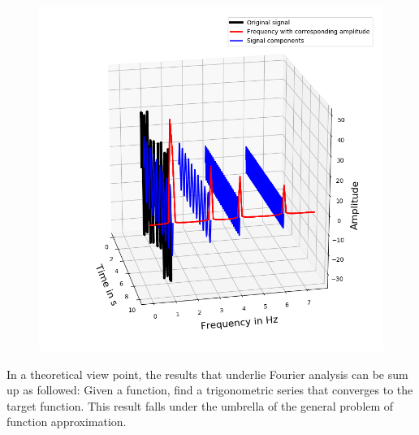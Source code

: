 \documentclass[../Main/thesis.tex]{subfiles}
\begin{document}
\begin{figure}[H] %
   \centering
   \includegraphics[width=6in]{../fig/fft_domain} 
   \caption{}
   \label{fig:fft_domain}
\end{figure}
\justify
In a theoretical view point, the results that underlie Fourier analysis can be sum up as followed: Given a function, find a trigonometric series that converges to the target function. This result falls under the umbrella of the general problem of function approximation.  
\end{document}
